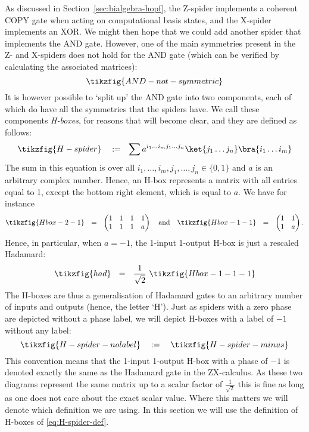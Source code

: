 \documentclass[a4paper,onecolumn,superscriptaddress,11pt,%
				unpublished,%
				allowfontchageintitle,%
				]{quantumarticle}
\begin{document}
As discussed in Section~\ref{sec:bialgebra-hopf}, the Z-spider implements a coherent COPY gate when acting on computational basis states, and the X-spider implements an XOR. We might then hope that we could add another spider that implements the AND gate. However, one of the main symmetries present in the Z- and X-spiders does not hold for the AND gate (which can be verified by calculating the associated matrices):
\begin{equation}
\tikzfig{AND-not-symmetric}
\end{equation}
It is however possible to `split up' the AND gate into two components, each of which do have all the symmetries that the spiders have. 
We call these components \emph{H-boxes}, for reasons that will become clear, and they are defined as follows:
\begin{equation}\label{eq:H-spider-def}
 \tikzfig{H-spider} \ \ \ := \ \ \sum a^{i_1\ldots i_m j_1\ldots j_n} \ket{j_1\ldots j_n}\bra{i_1\ldots i_m}
\end{equation}
The sum in this equation is over all $i_1,\ldots, i_m, j_1,\ldots, j_n\in\{0,1\}$ and $a$ is an arbitrary complex number. Hence, an H-box represents a matrix with all entries equal to 1, except the bottom right element, which is equal to $a$.
We have for instance
\begin{equation}
	\tikzfig{Hbox-2-1} \ \ = \ \ 
	\begin{pmatrix}
	1&1&1&1\\
	1&1&1&a
	\end{pmatrix}
	\ \ \ \text{and} \ \ \ 
	\tikzfig{Hbox-1-1} \ \ = \ \ 
	\begin{pmatrix}
	1&1\\
	1&a
	\end{pmatrix}.
\end{equation}
Hence, in particular, when $a=-1$, the 1-input 1-output H-box is just a rescaled Hadamard:
\begin{equation}\label{eq:Hbox-is-had}
	\tikzfig{had} \ \ = \ \ \frac{1}{\sqrt{2}}\ \tikzfig{Hbox-1-1-1}
\end{equation}
The H-boxes are thus a generalisation of Hadamard gates to an arbitrary number of inputs and outputs  (hence, the letter `H'). 
Just as spiders with a zero phase are depicted without a phase label, we will depict H-boxes with a label of $-1$ without any label:
\begin{equation}
	\tikzfig{H-spider-nolabel} \ \ \ :=\  \ \ \tikzfig{H-spider-minus}
\end{equation}
This convention means that the 1-input 1-output H-box with a phase of $-1$ is denoted exactly the same as the Hadamard gate in the ZX-calculus. As these two diagrams represent the same matrix up to a scalar factor of $\frac{1}{\sqrt{2}}$ this is fine as long as one does not care about the exact scalar value. Where this matters we will denote which definition we are using. In this section we will use the definition of H-boxes of \eqref{eq:H-spider-def}.
\end{document}
